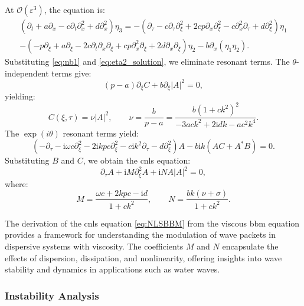 \documentclass[alpha-refs, 12pt]{wiley-article}
\renewcommand{\O}{\mathcal{O}}
\newcommand{\ui}{\mathrm{i}}
\newcommand{\eps}{\varepsilon}
\begin{document}
At $\O(\eps^3)$, the equation is:
\begin{multline}\label{eq:third_order_b}
  \left( \partial_t + a \partial_x - c \partial_t \partial_x^2 + d \partial_x^2 \right) \eta_3 = - \left( \partial_\tau - c \partial_\tau \partial_\xi^2 + 2 c p \partial_x \partial_\xi^2 - c \partial_x^2 \partial_\tau + d \partial_\xi^2 \right) \eta_1 \\
- \left( -p \partial_\xi + a \partial_\xi - 2 c \partial_t \partial_x \partial_\xi + c p \partial_x^2 \partial_\xi + 2 d \partial_x \partial_\xi \right) \eta_2 - b \partial_x (\eta_1 \eta_2).
\end{multline}
Substituting \eqref{eq:nb1} and \eqref{eq:eta2_solution}, we eliminate resonant terms. The $\theta$-independent terms give:
\begin{equation}\label{eq:C_equation}
  (p - a) \partial_\xi C + b \partial_\xi |A|^2 = 0,
\end{equation}
yielding:
\[
  C(\xi, \tau) = \nu |A|^2, \qquad \nu = \frac{b}{p - a} = \frac{b (1 + c k^2)^2}{-3 a c k^2 + 2 \ui d k - a c^2 k^4}.
\]
The $\exp(i \theta)$ resonant terms yield:
\begin{equation}\label{eq:resonance_bbm}
  \left( -\partial_\tau - \ui \omega c \partial_\xi^2 - 2 \ui k p c \partial_\xi^2 - c \ui k^2 \partial_\tau - d \partial_\xi^2 \right) A - b \ui k (A C + A^* B) = 0.
\end{equation}
Substituting $B$ and $C$, we obtain the \acrshort{cnls} equation:
\begin{equation}\label{eq:NLSBBM}
  \partial_\tau A + \ui M \partial_\xi^2 A + \ui N A |A|^2 = 0,
\end{equation}
where:
\[
  M = \frac{\omega c + 2 k p c - \ui d}{1 + c k^2}, \qquad N = \frac{b k (\nu + \sigma)}{1 + c k^2}.
\]

The derivation of the \acrshort{cnls} equation \eqref{eq:NLSBBM} from the viscous \acrshort{bbm} equation provides a framework for understanding the modulation of wave packets in dispersive systems with viscosity. The coefficients $M$ and $N$ encapsulate the effects of dispersion, dissipation, and nonlinearity, offering insights into wave stability and dynamics in applications such as water waves.

\subsubsection{Instability Analysis}
\end{document}
